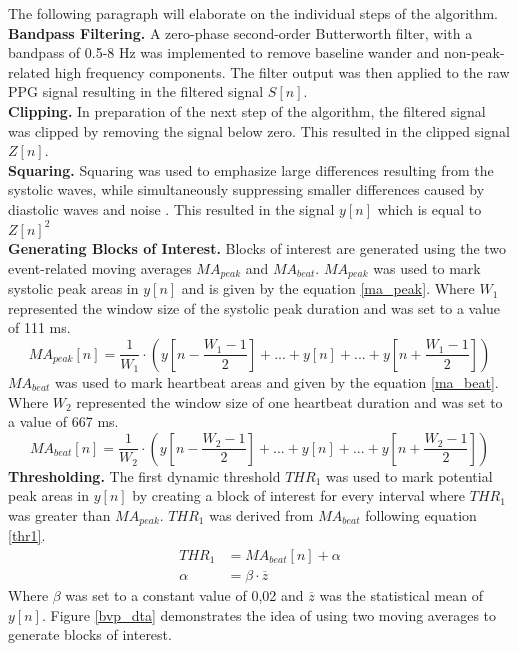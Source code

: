 The following paragraph will elaborate on the individual steps of the algorithm.\\
\textbf{Bandpass Filtering.} A zero-phase second-order Butterworth filter, with a bandpass of 0.5-8 Hz was implemented to remove baseline wander and non-peak-related high frequency components. The filter output was then applied to the raw PPG signal resulting in the filtered signal $S[n]$.\\
\textbf{Clipping.} In preparation of the next step of the algorithm, the filtered signal was clipped by removing the signal below zero. This resulted in the clipped signal $Z[n]$.\\
\textbf{Squaring.} Squaring was used to emphasize large differences resulting from the systolic waves, while simultaneously suppressing smaller differences caused by diastolic waves and noise \cite{Elgendi2013}.
This resulted in the signal $y[n]$ which is equal to $Z[n]^{2}$\\
\textbf{Generating Blocks of Interest.} Blocks of interest are generated using the two event-related moving averages $MA_{peak}$ and $MA_{beat}$. $MA_{peak}$ was used to mark systolic peak areas in $y[n]$ and is given by the equation \ref{ma_peak}. Where $W_{1}$ represented the window size of the systolic peak duration and was set to a value of 111 ms.\\
\begin{equation}\label{ma_peak}
MA_{peak}[n] = \frac{1}{W_{1}}\cdot(y[n-\frac{W_{1}-1}{2}]+...+y[n]+...+y[n+\frac{W_{1}-1}{2}])
\end{equation}
$MA_{beat}$ was used to mark heartbeat areas and given by the equation \ref{ma_beat}. Where $W_{2}$ represented the window size of one heartbeat duration and was set to a value of 667 ms.\\
\begin{equation}\label{ma_beat}
MA_{beat}[n] = \frac{1}{W_{2}}\cdot(y[n-\frac{W_{2}-1}{2}]+...+y[n]+...+y[n+\frac{W_{2}-1}{2}])
\end{equation}
\textbf{Thresholding.} The first dynamic threshold $THR_{1}$ was used to mark potential peak areas in $y[n]$ by creating a block of interest for every interval where $THR_{1}$ was greater than $MA_{peak}$. $THR_{1}$ was derived from $MA_{beat}$ following equation \ref{thr1}.
\begin{align} \label{thr1}
THR_{1} &= MA_{beat}[n]+\alpha \\
\alpha &= \beta\cdot\overline{z}
\end{align}
\newpage
Where $\beta$ was set to a constant value of 0,02 and $\overline{z}$ was the statistical mean of $y[n]$. Figure \ref{bvp_dta} demonstrates the idea of using two moving averages to generate blocks of interest.

